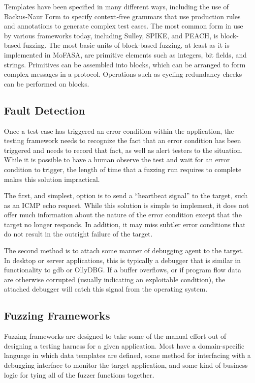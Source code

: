 \documentclass{report}
\begin{document}
Templates have been specified in many different ways, including the use of Backus-Naur Form to specify context-free grammars that use
production rules and annotations to generate complex test cases. The most common form in use by various frameworks today, including Sulley,
SPIKE, and PEACH, is block-based fuzzing. The most basic units of block-based fuzzing, at least as it is implemented in MoFASA, are primitive
elements such as integers, bit fields, and strings. Primitives can be assembled into blocks, which can be arranged to form complex messages
in a protocol. Operations such as cycling redundancy checks can be performed on blocks.

\subsection{Fault Detection}
Once a test case has triggered an error condition within the application, the testing framework needs to recognize the fact
that an error condition has been triggered and needs to record that fact, as well as alert testers to the situation.
While it is possible to have a human observe the test and wait for an error condition to trigger, the length of time that
a fuzzing run requires to complete makes this solution impractical.

The first, and simplest, option is to send a ``heartbeat signal'' to the target, such as an ICMP echo request. While this
solution is simple to implement, it does not offer much information about the nature of the error condition except that the
target no longer responds. In addition, it may miss subtler error conditions that do not result in the outright failure
of the target.

The second method is to attach some manner of debugging agent to the target. In desktop or server applications, this is typically
a debugger that is similar in functionality to gdb or OllyDBG. If a buffer overflows, or if program flow data are otherwise
corrupted (usually indicating an exploitable condition), the attached debugger will catch this signal from the operating system.

\subsection{Fuzzing Frameworks}

Fuzzing frameworks are designed to take some of the manual effort out of designing a testing harness for a given application.
Most have a domain-specific language in which data templates are defined, some method for interfacing with a debugging interface
to monitor the target application, and some kind of business logic for tying all of the fuzzer functions together.
\end{document}
